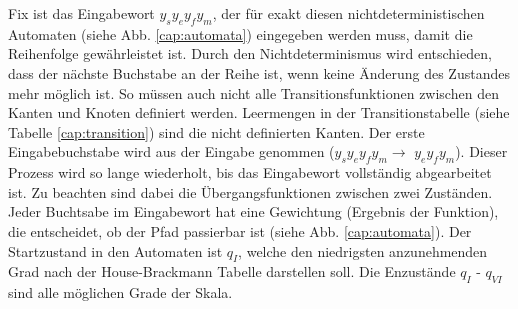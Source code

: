 Fix ist das Eingabewort \flqq $y_sy_ey_fy_m$\frqq, der für exakt diesen nichtdeterministischen Automaten (siehe Abb. \ref{cap:automata}) eingegeben werden muss, damit die Reihenfolge gewährleistet ist. Durch den Nichtdeterminismus wird entschieden, dass der nächste Buchstabe an der Reihe ist, wenn keine Änderung des Zustandes mehr möglich ist. So müssen auch nicht alle Transitionsfunktionen zwischen den Kanten und Knoten definiert werden. Leermengen in der Transitionstabelle (siehe Tabelle \ref{cap:transition}) sind die nicht definierten Kanten. Der erste Eingabebuchstabe wird aus der Eingabe genommen (\flqq $y_sy_ey_fy_m$\frqq $\rightarrow$ \flqq $y_ey_fy_m$\frqq). Dieser Prozess wird so lange wiederholt, bis das Eingabewort vollständig abgearbeitet ist. Zu beachten sind dabei die Übergangsfunktionen zwischen zwei Zuständen. Jeder Buchtsabe im Eingabewort hat eine Gewichtung (Ergebnis der Funktion), die entscheidet, ob der Pfad passierbar ist (siehe Abb. \ref{cap:automata}). Der Startzustand in den Automaten ist $q_I$, welche den niedrigsten anzunehmenden Grad nach der House-Brackmann Tabelle darstellen soll. Die Enzustände $q_I$ - $q_{VI}$  sind alle möglichen Grade der Skala.

\begin{table}[t]\vspace{1ex}\centering
  \caption[Übergangsfunktion $\delta$ des Automaten für die Bestimmung des Grades]{Übergangsfunktion $\delta$ des Automaten für die Bestimmung des Grades}\label{cap:transition}
\vspace{2ex}\end{table}\label{table:transition}

